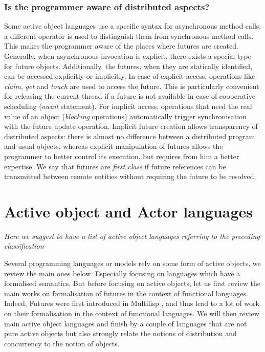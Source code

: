\subsubsection{Is the programmer aware of distributed aspects?}
Some active object languages use a specific syntax for asynchronous
method calls: a different operator is used to distinguish them from
synchronous method calls. This makes the programmer aware of the
places where futures are created. Generally, when asynchronous
invocation is explicit, there exists a special type for future objects.
Additionally, the futures, when they are statically identified, can be
accessed explicitly or implicitly. In case of explicit access,
operations like \emph{claim}, \emph{get} and \emph{touch} are used to
access the future. This is particularly convenient for releasing the
current thread if a future is not available in case of cooperative
scheduling (\emph{await} statement). For implicit access, operations that need the real
value of an object (\emph{blocking} operations) automatically trigger
synchronisation with the future update operation.
Implicit future creation allows transparency of distributed aspects:
there is almost no difference between a distributed program and usual
objects, whereas explicit manipulation of futures allows the
programmer to better control its execution, but requires from him a
better expertise. We say that futures
are \emph{first class} if future references can be transmitted between
remote entities without requiring the future to be resolved.





\section{Active object and Actor languages}\label{sec:overview}
\emph{Here we suggest to have a list of active object languages referring to the 
preceding classification}

Several programming languages or models rely on some form of active
objects, we review the main ones below. Especially focusing on
languages which have a formalised semantics. But before focusing on
active objects, let us first review the main works on formalisation of
futures in the context of functional languages.
Indeed, Futures
were first introduced in Multilisp \cite{Halstead85}, and thus lead to
a lot of work on their formalisation in the context of 
functional languages. We will then review main active object languages
and finish by a couple of languages that are not pure active objects
but also strongly relate the notions of distribution and concurrency to
the notion of objects.




